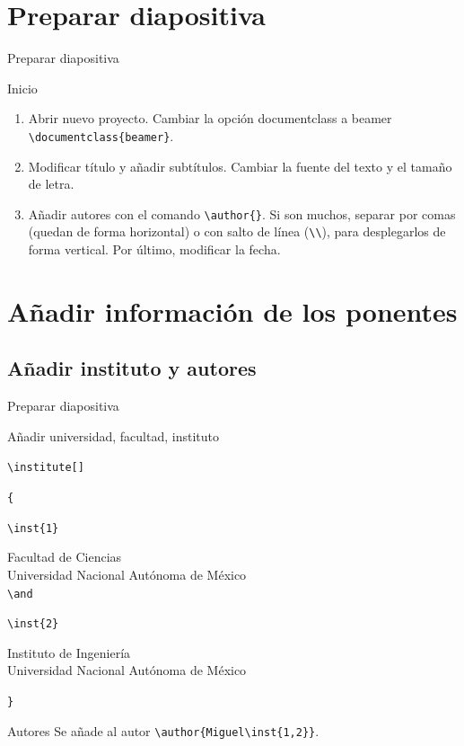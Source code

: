 \documentclass[aspectratio=169, 10pt]{beamer}
\begin{document}
\section{Preparar diapositiva}
\begin{frame}[fragile]{Preparar diapositiva} 
\begin{block}{Inicio} \pause
    \begin{enumerate}
        \item Abrir nuevo proyecto. Cambiar la opción documentclass a beamer \verb|\documentclass{beamer}|. \pause 
        \item Modificar título y añadir subtítulos. Cambiar la fuente del texto y el tamaño de letra. \pause
        \item Añadir autores con el comando \verb|\author{}|. Si son muchos, separar por comas (quedan de forma horizontal) o con salto de línea (\verb|\\|), para desplegarlos de forma vertical. Por último, modificar la fecha. 
    \end{enumerate}
\end{block}    
\end{frame}

\section{Añadir información de los ponentes}
\subsection{Añadir instituto y autores} \pause
\begin{frame}[fragile]{Preparar diapositiva}
\begin{block}{Añadir universidad, facultad, instituto} \pause

\verb|\institute[]| \pause %

\verb|{| \pause

    \verb|\inst{1}| \pause
    
    Facultad de Ciencias\\ \pause
    Universidad Nacional Autónoma de México \pause
    \\ 
    \verb|\and|

    \verb|\inst{2}| \pause
    
    Instituto de Ingeniería\\ \pause
    Universidad Nacional Autónoma de México \pause

\verb|}| 

\end{block}
\begin{alertblock}{Autores} \pause
    Se añade al autor \verb|\author{Miguel\inst{1,2}}|. 
\end{alertblock}
\end{frame}
\end{document}

